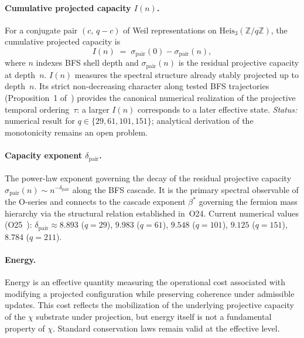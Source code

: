   \paragraph{Cumulative projected capacity \texorpdfstring{$I(n)$}{I(n)}.}
    For a conjugate pair $(c,\,q-c)$ of Weil representations on
    $\mathrm{Heis}_3(\mathbb{Z}/q\mathbb{Z})$, the cumulative projected capacity is
    \[
      I(n) \;=\; \sigma_{\mathrm{pair}}(0) - \sigma_{\mathrm{pair}}(n),
    \]
    where $n$ indexes BFS shell depth and $\sigma_{\mathrm{pair}}(n)$ is the
    residual projective capacity at depth~$n$.
    $I(n)$ measures the spectral structure already stably projected up to depth~$n$.
    Its strict non-decreasing character along tested BFS trajectories (Proposition~1
    of~\cite{Beau2026a28}) provides the canonical numerical realization of the
    projective temporal ordering~$\tau$: a larger $I(n)$ corresponds to a later
    effective state.
    \emph{Status:} numerical result for $q \in \{29,61,101,151\}$; analytical
    derivation of the monotonicity remains an open problem.

  \paragraph{Capacity exponent \texorpdfstring{$\delta_{\mathrm{pair}}$}{δpair}.}
    The power-law exponent governing the decay of the residual projective capacity
    $\sigma_{\mathrm{pair}}(n) \sim n^{-\delta_{\mathrm{pair}}}$ along the BFS
    cascade.
    It is the primary spectral observable of the O-series and connects to the
    cascade exponent $\beta^*$ governing the fermion mass hierarchy via
    the structural relation established in~O24.
    Current numerical values (O25~\cite{Beau2026a29}):
    $\delta_{\mathrm{pair}} \approx 8.893$ ($q=29$),
    $9.983$ ($q=61$), $9.548$ ($q=101$), $9.125$ ($q=151$), $8.784$ ($q=211$).

  \paragraph{Energy.}
    Energy is an effective quantity measuring the operational cost associated
    with modifying a projected configuration while preserving coherence under
    admissible updates.
    This cost reflects the mobilization of the underlying projective capacity
    of the $\chi$ substrate under projection, but energy itself is not a
    fundamental property of $\chi$.
    Standard conservation laws remain valid at the effective level.

